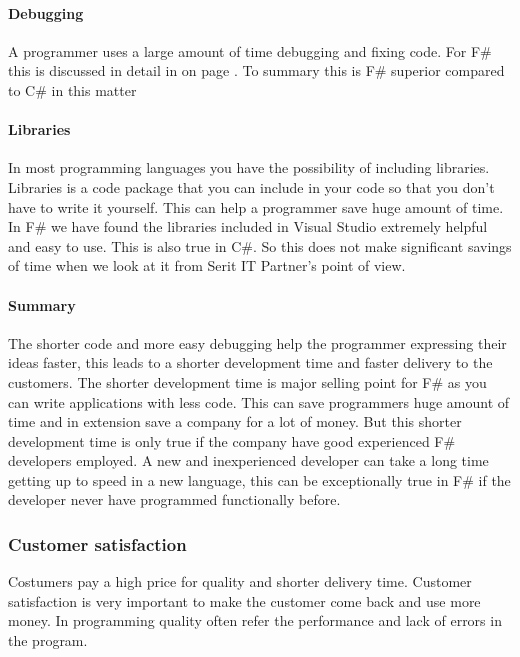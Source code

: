\documentclass[12pt, a4paper]{article}
\begin{document}
\paragraph{Debugging}

A programmer uses a large amount of time debugging and fixing code. For F\# this is discussed in detail in  on page \pageref{debug}. To summary this is F\# superior compared to C\# in this matter

\paragraph{Libraries}

In most programming languages you have the possibility of including libraries. Libraries is a code package that you can include in your code so that you don't have to write it yourself. This can help a programmer save huge amount of time.\\

In F\# we have found the libraries included in Visual Studio extremely helpful and easy to use. This is also true in C\#. So this does not make significant savings of time when we look at it from Serit IT Partner's point of view.

\paragraph{Summary}
The shorter code and more easy debugging help the programmer expressing their ideas faster, this leads to a shorter development time and faster delivery to the customers. The shorter development time is major selling point for F\# as you can write applications with less code. This can save programmers huge amount of time and in extension save a company for a lot of money. But this shorter development time is only true if the company have good experienced F\# developers employed. A new and inexperienced developer can take a long time getting up to speed in a new language, this can be exceptionally true in F\# if the developer never have programmed functionally before.   

\newpage
\subsubsection{Customer satisfaction}
Costumers pay a high price for quality and shorter delivery time. Customer satisfaction is very important to make the customer come back and use more money. In programming quality often refer the performance and lack of errors in the program.\\
\end{document}
